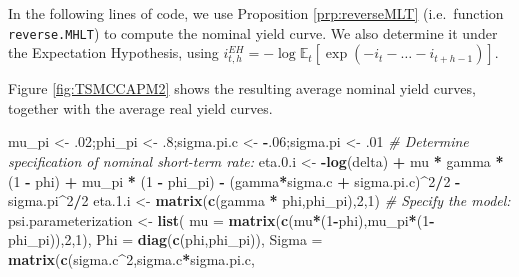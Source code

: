 \documentclass[
  12pt,
]{book}
\newenvironment{Shaded}{\begin{snugshade}}{\end{snugshade}}
\newcommand{\AttributeTok}[1]{\textcolor[rgb]{0.13,0.29,0.53}{#1}}
\newcommand{\CommentTok}[1]{\textcolor[rgb]{0.56,0.35,0.01}{\textit{#1}}}
\newcommand{\DecValTok}[1]{\textcolor[rgb]{0.00,0.00,0.81}{#1}}
\newcommand{\FloatTok}[1]{\textcolor[rgb]{0.00,0.00,0.81}{#1}}
\newcommand{\FunctionTok}[1]{\textcolor[rgb]{0.13,0.29,0.53}{\textbf{#1}}}
\newcommand{\NormalTok}[1]{#1}
\newcommand{\OtherTok}[1]{\textcolor[rgb]{0.56,0.35,0.01}{#1}}
\newcommand{\SpecialCharTok}[1]{\textcolor[rgb]{0.81,0.36,0.00}{\textbf{#1}}}
\theoremstyle{definition}
\theoremstyle{definition}
\theoremstyle{definition}
\theoremstyle{definition}
\theoremstyle{remark}
\begin{document}
In the following lines of code, we use Proposition \ref{prp:reverseMLT} (i.e.~function \texttt{reverse.MHLT}) to compute the nominal yield curve. We also determine it under the Expectation Hypothesis, using \(i^{EH}_{t,h} = - \log \mathbb{E}_t [\exp(-i_t - \dots - i_{t+h-1})]\).

Figure \ref{fig:TSMCCAPM2} shows the resulting average nominal yield curves, together with the average real yield curves.

\begin{Shaded}
\begin{Highlighting}[]
\NormalTok{mu\_pi }\OtherTok{\textless{}{-}}\NormalTok{ .}\DecValTok{02}\NormalTok{;phi\_pi }\OtherTok{\textless{}{-}}\NormalTok{ .}\DecValTok{8}\NormalTok{;sigma.pi.c }\OtherTok{\textless{}{-}} \SpecialCharTok{{-}}\NormalTok{.}\DecValTok{06}\NormalTok{;sigma.pi   }\OtherTok{\textless{}{-}}\NormalTok{ .}\DecValTok{01}
\CommentTok{\# Determine specification of nominal short{-}term rate:}
\NormalTok{eta.}\FloatTok{0.}\NormalTok{i }\OtherTok{\textless{}{-}} \SpecialCharTok{{-}}\FunctionTok{log}\NormalTok{(delta) }\SpecialCharTok{+}\NormalTok{ mu }\SpecialCharTok{*}\NormalTok{ gamma }\SpecialCharTok{*}\NormalTok{ (}\DecValTok{1} \SpecialCharTok{{-}}\NormalTok{ phi) }\SpecialCharTok{+}\NormalTok{ mu\_pi }\SpecialCharTok{*}\NormalTok{ (}\DecValTok{1} \SpecialCharTok{{-}}\NormalTok{ phi\_pi) }\SpecialCharTok{{-}}
\NormalTok{  (gamma}\SpecialCharTok{*}\NormalTok{sigma.c }\SpecialCharTok{+}\NormalTok{ sigma.pi.c)}\SpecialCharTok{\^{}}\DecValTok{2}\SpecialCharTok{/}\DecValTok{2} \SpecialCharTok{{-}}\NormalTok{ sigma.pi}\SpecialCharTok{\^{}}\DecValTok{2}\SpecialCharTok{/}\DecValTok{2}
\NormalTok{eta.}\FloatTok{1.}\NormalTok{i }\OtherTok{\textless{}{-}} \FunctionTok{matrix}\NormalTok{(}\FunctionTok{c}\NormalTok{(gamma }\SpecialCharTok{*}\NormalTok{ phi,phi\_pi),}\DecValTok{2}\NormalTok{,}\DecValTok{1}\NormalTok{)}
\CommentTok{\# Specify the model:}
\NormalTok{psi.parameterization }\OtherTok{\textless{}{-}} \FunctionTok{list}\NormalTok{(}
  \AttributeTok{mu =} \FunctionTok{matrix}\NormalTok{(}\FunctionTok{c}\NormalTok{(mu}\SpecialCharTok{*}\NormalTok{(}\DecValTok{1}\SpecialCharTok{{-}}\NormalTok{phi),mu\_pi}\SpecialCharTok{*}\NormalTok{(}\DecValTok{1}\SpecialCharTok{{-}}\NormalTok{phi\_pi)),}\DecValTok{2}\NormalTok{,}\DecValTok{1}\NormalTok{),}
  \AttributeTok{Phi =} \FunctionTok{diag}\NormalTok{(}\FunctionTok{c}\NormalTok{(phi,phi\_pi)),}
  \AttributeTok{Sigma =} \FunctionTok{matrix}\NormalTok{(}\FunctionTok{c}\NormalTok{(sigma.c}\SpecialCharTok{\^{}}\DecValTok{2}\NormalTok{,sigma.c}\SpecialCharTok{*}\NormalTok{sigma.pi.c,}

\end{Highlighting}
\end{Shaded}
\end{document}
